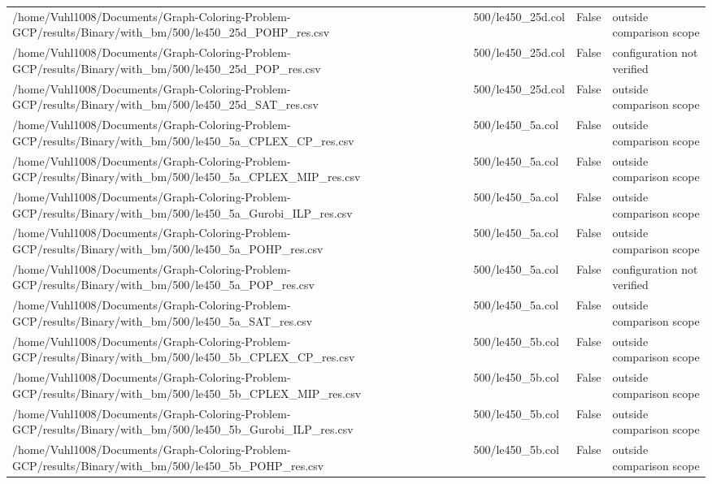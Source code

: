 \begin{table}[htbp]
\begin{tabular}{llll}
/home/Vuhl1008/Documents/Graph-Coloring-Problem-GCP/results/Binary/with\_bm/500/le450\_25d\_POHP\_res.csv & 500/le450\_25d.col & False & outside comparison scope \\
/home/Vuhl1008/Documents/Graph-Coloring-Problem-GCP/results/Binary/with\_bm/500/le450\_25d\_POP\_res.csv & 500/le450\_25d.col & False & configuration not verified \\
/home/Vuhl1008/Documents/Graph-Coloring-Problem-GCP/results/Binary/with\_bm/500/le450\_25d\_SAT\_res.csv & 500/le450\_25d.col & False & outside comparison scope \\
/home/Vuhl1008/Documents/Graph-Coloring-Problem-GCP/results/Binary/with\_bm/500/le450\_5a\_CPLEX\_CP\_res.csv & 500/le450\_5a.col & False & outside comparison scope \\
/home/Vuhl1008/Documents/Graph-Coloring-Problem-GCP/results/Binary/with\_bm/500/le450\_5a\_CPLEX\_MIP\_res.csv & 500/le450\_5a.col & False & outside comparison scope \\
/home/Vuhl1008/Documents/Graph-Coloring-Problem-GCP/results/Binary/with\_bm/500/le450\_5a\_Gurobi\_ILP\_res.csv & 500/le450\_5a.col & False & outside comparison scope \\
/home/Vuhl1008/Documents/Graph-Coloring-Problem-GCP/results/Binary/with\_bm/500/le450\_5a\_POHP\_res.csv & 500/le450\_5a.col & False & outside comparison scope \\
/home/Vuhl1008/Documents/Graph-Coloring-Problem-GCP/results/Binary/with\_bm/500/le450\_5a\_POP\_res.csv & 500/le450\_5a.col & False & configuration not verified \\
/home/Vuhl1008/Documents/Graph-Coloring-Problem-GCP/results/Binary/with\_bm/500/le450\_5a\_SAT\_res.csv & 500/le450\_5a.col & False & outside comparison scope \\
/home/Vuhl1008/Documents/Graph-Coloring-Problem-GCP/results/Binary/with\_bm/500/le450\_5b\_CPLEX\_CP\_res.csv & 500/le450\_5b.col & False & outside comparison scope \\
/home/Vuhl1008/Documents/Graph-Coloring-Problem-GCP/results/Binary/with\_bm/500/le450\_5b\_CPLEX\_MIP\_res.csv & 500/le450\_5b.col & False & outside comparison scope \\
/home/Vuhl1008/Documents/Graph-Coloring-Problem-GCP/results/Binary/with\_bm/500/le450\_5b\_Gurobi\_ILP\_res.csv & 500/le450\_5b.col & False & outside comparison scope \\
/home/Vuhl1008/Documents/Graph-Coloring-Problem-GCP/results/Binary/with\_bm/500/le450\_5b\_POHP\_res.csv & 500/le450\_5b.col & False & outside comparison scope \\

\end{tabular}
\end{table}
